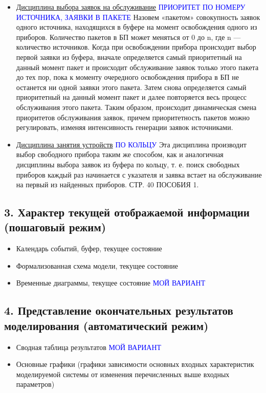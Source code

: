 \documentclass[a4paper,11pt]{report}
\begin{document}
\begin{itemize}
\begin{itemize}
    \item \underline{Дисциплина выбора заявок на обслуживание} \textcolor{blue}{ПРИОРИТЕТ ПО НОМЕРУ ИСТОЧНИКА, ЗАЯВКИ В ПАКЕТЕ}
    \newline Назовем  «пакетом»  совокупность  заявок  одного  источника, находящихся в буфере на момент освобождения одного из приборов.
    \newline Количество  пакетов  в  БП  может  меняться  от  0  до  n,  где  n  — количество источников.
    \newline Когда при освобождении прибора происходит выбор первой заявки из буфера, вначале определяется самый приоритетный на данный момент пакет и происходит обслуживание заявок только этого пакета до тех пор, пока к моменту очередного освобождения прибора в БП не останется ни одной заявки этого пакета. Затем снова определяется самый приоритетный на данный момент пакет и далее повторяется весь процесс обслуживания этого пакета. Таким образом, происходит динамическая смена приоритетов обслуживания заявок, причем приоритетность пакетов можно регулировать, изменяя интенсивность генерации заявок источниками.
    \item \underline{Дисциплина занятия устройств} \textcolor{blue}{ПО КОЛЬЦУ}
    \newline Эта дисциплина производит выбор свободного прибора таким же способом, как и аналогичная дисциплины выбора заявок из буфера по кольцу, т. е. поиск свободных приборов каждый раз начинается с указателя и заявка встает на обслуживание на первый из найденных приборов.
    \newline СТР. 40 ПОСОБИЯ 1.
  \end{itemize}
\end{itemize}

\subsection{3. Характер текущей отображаемой информации (пошаговый режим)}
\begin{itemize}
  \item Календарь событий, буфер, текущее состояние
  \item Формализованная схема модели, текущее состояние
  \item Временные диаграммы, текущее состояние \textcolor{blue}{МОЙ ВАРИАНТ}
\end{itemize}

\subsection{4. Представление окончательных результатов моделирования (автоматический режим)}
\begin{itemize}
  \item Сводная таблица результатов \textcolor{blue}{МОЙ ВАРИАНТ}
  \item Основные графики (графики зависимости основных входных характеристик моделируемой системы от
                          изменения перечисленных выше входных параметров)
\end{itemize}
\end{document}
